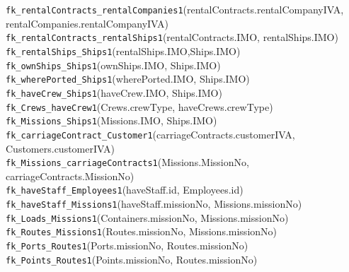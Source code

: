 \documentclass[12pt]{scrartcl}
\begin{document}
\begin{flushleft}
	\verb|fk_rentalContracts_rentalCompanies1|(rentalContracts.rentalCompanyIVA, rentalCompanies.rentalCompanyIVA)\\
	\verb|fk_rentalContracts_rentalShips1|(rentalContracts.IMO, rentalShips.IMO)\\
	\verb|fk_rentalShips_Ships1|(rentalShips.IMO,Ships.IMO)\\
	\verb|fk_ownShips_Ships1|(ownShips.IMO, Ships.IMO)\\
	\verb|fk_wherePorted_Ships1|(wherePorted.IMO, Ships.IMO)\\
	\verb|fk_haveCrew_Ships1|(haveCrew.IMO, Ships.IMO)\\
	\verb|fk_Crews_haveCrew1|(Crews.crewType, haveCrews.crewType)\\
	\verb|fk_Missions_Ships1|(Missions.IMO, Ships.IMO)\\
	\verb|fk_carriageContract_Customer1|(carriageContracts.customerIVA, Customers.customerIVA)\\
	\verb|fk_Missions_carriageContracts1|(Missions.MissionNo, carriageContracts.MissionNo)\\
	\verb|fk_haveStaff_Employees1|(haveStaff.id, Employees.id)\\
	\verb|fk_haveStaff_Missions1|(haveStaff.missionNo, Missions.missionNo)\\
	\verb|fk_Loads_Missions1|(Containers.missionNo, Missions.missionNo)\\
	\verb|fk_Routes_Missions1|(Routes.missionNo, Missions.missionNo)\\
	\verb|fk_Ports_Routes1|(Ports.missionNo, Routes.missionNo)\\
	\verb|fk_Points_Routes1|(Points.missionNo, Routes.missionNo)\\
\end{flushleft}
\newpage

\newpage

\newpage

\newpage

\end{document}
